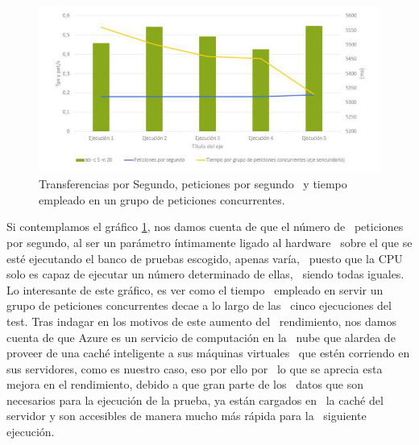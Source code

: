 \documentclass[11pt,twoside,a4paper]{book}
\begin{document}
\begin{figure}
   \includegraphics[width=\textwidth]{grafica1.jpg}
   \caption{Transferencias por Segundo, peticiones por segundo \
   y tiempo empleado en un grupo de peticiones concurrentes.}
   \label{Fig1}
\end{figure}

Si contemplamos el gráfico \ref{Fig1}, nos damos cuenta de que el número de \
peticiones por segundo, al ser un parámetro íntimamente ligado al hardware \
sobre el que se esté ejecutando el banco de pruebas escogido, apenas varía, \
puesto que la CPU solo es capaz de ejecutar un número determinado de ellas, \
siendo todas iguales. Lo interesante de este gráfico, es ver como el tiempo \
empleado en servir un grupo de peticiones concurrentes decae a lo largo de las \
cinco ejecuciones del test. Tras indagar en los motivos de este aumento del \
rendimiento, nos damos cuenta de que Azure es un servicio de computación en la \
nube que alardea de proveer de una caché inteligente a sus máquinas virtuales \
que estén corriendo en sus servidores, como es nuestro caso, eso por ello por \
lo que se aprecia esta mejora en el rendimiento, debido a que gran parte de los \
datos que son necesarios para la ejecución de la prueba, ya están cargados en \
la caché del servidor y son accesibles de manera mucho más rápida para la \
siguiente ejecución. \newline
\end{document}
